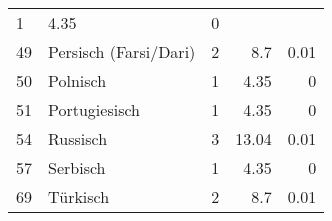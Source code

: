 \begin{longtable}{lXrrr}
       \num{1} &
       \num[round-mode=places,round-precision=2]{4.35} &
         \num[round-mode=places,round-precision=2]{0} \\

     49 &
     \multicolumn{1}{X}{ Persisch (Farsi/Dari)   } &


       \num{2} &
       \num[round-mode=places,round-precision=2]{8.7} &
         \num[round-mode=places,round-precision=2]{0.01} \\

     50 &
     \multicolumn{1}{X}{ Polnisch   } &


       \num{1} &
       \num[round-mode=places,round-precision=2]{4.35} &
         \num[round-mode=places,round-precision=2]{0} \\

     51 &
     \multicolumn{1}{X}{ Portugiesisch   } &


       \num{1} &
       \num[round-mode=places,round-precision=2]{4.35} &
         \num[round-mode=places,round-precision=2]{0} \\

     54 &
     \multicolumn{1}{X}{ Russisch   } &


       \num{3} &
       \num[round-mode=places,round-precision=2]{13.04} &
         \num[round-mode=places,round-precision=2]{0.01} \\

     57 &
     \multicolumn{1}{X}{ Serbisch   } &


       \num{1} &
       \num[round-mode=places,round-precision=2]{4.35} &
         \num[round-mode=places,round-precision=2]{0} \\

     69 &
     \multicolumn{1}{X}{ Türkisch   } &


       \num{2} &
       \num[round-mode=places,round-precision=2]{8.7} &
         \num[round-mode=places,round-precision=2]{0.01} \\


\end{longtable}

